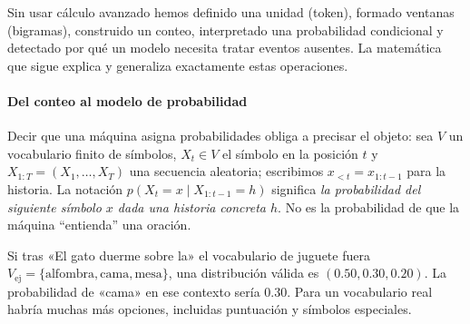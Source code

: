 \begin{idea}
Sin usar cálculo avanzado hemos definido una unidad (token), formado ventanas (bigramas), construido un conteo, interpretado una probabilidad condicional y detectado por qué un modelo necesita tratar eventos ausentes. La matemática que sigue explica y generaliza exactamente estas operaciones.
\end{idea}




\paragraph{Del conteo al modelo de probabilidad}
Decir que una máquina asigna probabilidades obliga a precisar el objeto: sea $V$ un vocabulario finito de símbolos, $X_t\in V$ el símbolo en la posición $t$ y $X_{1:T}=(X_1,\ldots,X_T)$ una secuencia aleatoria; escribimos $x_{<t}=x_{1:t-1}$ para la historia. La notación $p(X_t=x\mid X_{1:t-1}=h)$ significa \emph{la probabilidad del siguiente símbolo $x$ dada una historia concreta $h$}. No es la probabilidad de que la máquina ``entienda'' una oración.

\begin{ejemplo}
Si tras «El gato duerme sobre la» el vocabulario de juguete fuera $V_{\mathrm{ej}}=\{\text{alfombra},\text{cama},\text{mesa}\}$, una distribución válida es $(0.50,0.30,0.20)$. La probabilidad de «cama» en ese contexto sería $0.30$. Para un vocabulario real habría muchas más opciones, incluidas puntuación y símbolos especiales.
\end{ejemplo}

